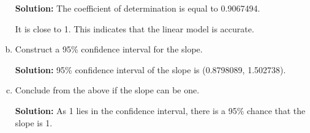 \documentclass[12pt,letterpaper]{article}
\begin{document}
\begin{enumerate}[a.]
  \textbf{Solution:}
  The coefficient of determination is equal to 0.9067494.

  It is close to 1. This indicates that the linear model is accurate.
  \item Construct a 95\% confidence interval for the slope.

  \textbf{Solution:}
  95\% confidence interval of the slope is (0.8798089, 1.502738).
  \item Conclude from the above if the slope can be one.

  \textbf{Solution:}
  As 1 lies in the confidence interval, there is a 95\% chance that the slope is 1.
\end{enumerate}
\newpage

\end{document}
